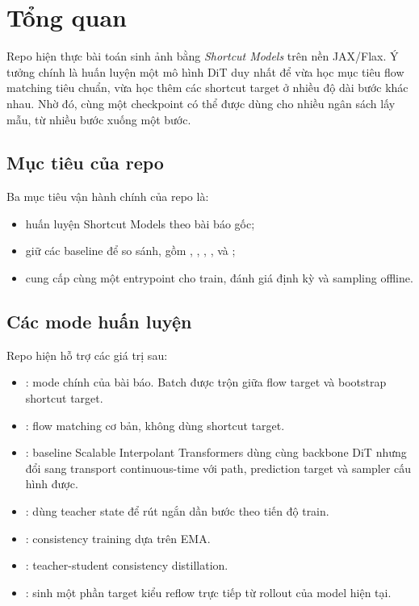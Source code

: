 \section{Tổng quan}

Repo \repo{} hiện thực bài toán sinh ảnh bằng \textit{Shortcut Models} trên nền JAX/Flax.
Ý tưởng chính là huấn luyện một mô hình DiT duy nhất để vừa học mục tiêu flow matching tiêu chuẩn,
vừa học thêm các shortcut target ở nhiều độ dài bước khác nhau. Nhờ đó, cùng một checkpoint có thể
được dùng cho nhiều ngân sách lấy mẫu, từ nhiều bước xuống một bước.

\subsection{Mục tiêu của repo}

Ba mục tiêu vận hành chính của repo là:

\begin{itemize}
    \item huấn luyện Shortcut Models theo bài báo gốc;
    \item giữ các baseline để so sánh, gồm , , , ,
     và ;
    \item cung cấp cùng một entrypoint cho train, đánh giá định kỳ và sampling offline.
\end{itemize}

\subsection{Các mode huấn luyện}

Repo hiện hỗ trợ các giá trị  sau:

\begin{itemize}
    \item {}: mode chính của bài báo. Batch được trộn giữa flow target và bootstrap shortcut target.
    \item {}: flow matching cơ bản, không dùng shortcut target.
    \item {}: baseline Scalable Interpolant Transformers dùng cùng backbone DiT nhưng đổi sang transport continuous-time với path, prediction target và sampler cấu hình được.
    \item {}: dùng teacher state để rút ngắn dần bước theo tiến độ train.
    \item {}: consistency training dựa trên EMA.
    \item {}: teacher-student consistency distillation.
    \item {}: sinh một phần target kiểu reflow trực tiếp từ rollout của model hiện tại.
\end{itemize}

